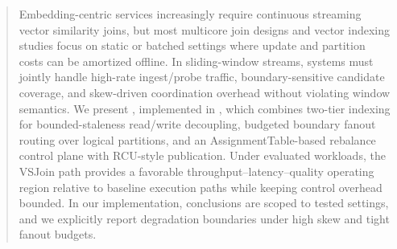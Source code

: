 \begin{abstract}
Embedding-centric services increasingly require continuous streaming vector similarity joins, but most multicore join designs and vector indexing studies focus on static or batched settings where update and partition costs can be amortized offline. In sliding-window streams, systems must jointly handle high-rate ingest/probe traffic, boundary-sensitive candidate coverage, and skew-driven coordination overhead without violating window semantics. We present \system, implemented in \sageflow, which combines two-tier indexing for bounded-staleness read/write decoupling, budgeted boundary fanout routing over logical partitions, and an AssignmentTable-based rebalance control plane with RCU-style publication. Under evaluated workloads, the VSJoin path provides a favorable throughput--latency--quality operating region relative to baseline execution paths while keeping control overhead bounded. In our implementation, conclusions are scoped to tested settings, and we explicitly report degradation boundaries under high skew and tight fanout budgets.
\end{abstract}